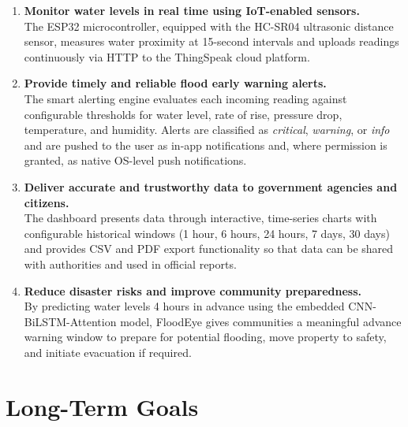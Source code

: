 \begin{enumerate}[leftmargin=1.5em]
  \item \textbf{Monitor water levels in real time using IoT-enabled sensors.}\\
  The ESP32 microcontroller, equipped with the HC-SR04 ultrasonic distance sensor, measures water proximity at 15-second intervals and uploads readings continuously via HTTP to the ThingSpeak cloud platform.

  \item \textbf{Provide timely and reliable flood early warning alerts.}\\
  The smart alerting engine evaluates each incoming reading against configurable thresholds for water level, rate of rise, pressure drop, temperature, and humidity. Alerts are classified as \textit{critical}, \textit{warning}, or \textit{info} and are pushed to the user as in-app notifications and, where permission is granted, as native OS-level push notifications.

  \item \textbf{Deliver accurate and trustworthy data to government agencies and citizens.}\\
  The dashboard presents data through interactive, time-series charts with configurable historical windows (1 hour, 6 hours, 24 hours, 7 days, 30 days) and provides CSV and PDF export functionality so that data can be shared with authorities and used in official reports.

  \item \textbf{Reduce disaster risks and improve community preparedness.}\\
  By predicting water levels 4 hours in advance using the embedded CNN-BiLSTM-Attention model, FloodEye gives communities a meaningful advance warning window to prepare for potential flooding, move property to safety, and initiate evacuation if required.
\end{enumerate}

\section{Long-Term Goals}

